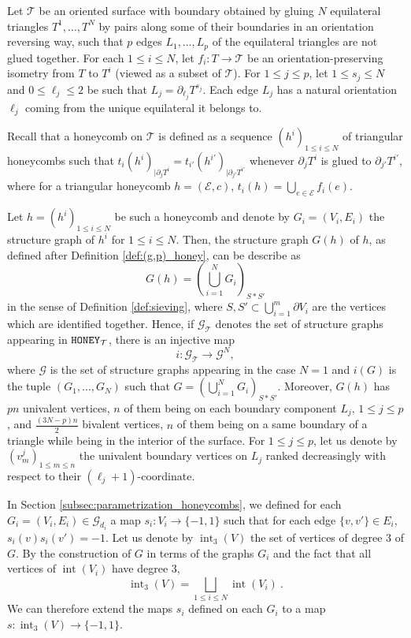 \documentclass[11pt,a4paper]{amsart}
\providecommand{\honey}{\texttt{\textsc{HONEY}}}
\DeclareMathOperator{\interior}{int}
\numberwithin{equation}{section}
\theoremstyle{definition}
\begin{document}
Let $\mathcal{T}$ be an oriented surface with boundary obtained 
by gluing $N$ equilateral triangles $T^1,\ldots,T^N$ by pairs along some of their boundaries in an orientation reversing way, 
such that $p$ edges $L_1,\ldots,L_{p}$ of the equilateral triangles are not glued together. For each $1\leqslant i\leqslant N$, let $f_i:T\rightarrow \mathcal{T}$ be an orientation-preserving isometry from $T$ to $T^i$ (viewed as a subset of $\mathcal{T}$). For $1\leqslant j\leqslant p$, let $1 \leqslant s_j \leqslant N $ and 
$ 0 \leqslant \ell_j \leqslant 2$ 
be such that $L_j=\partial_{\ell_j}T^{s_j}$. Each edge $L_j$ has a natural orientation $\ell_j$ coming from the unique equilateral it belongs to.  

\noindent
Recall that a honeycomb on $\mathcal{T}$ is defined as a sequence $(h^i)_{1\leqslant i\leqslant N}$ of triangular honeycombs such that $t_i(h^i)_{\vert \partial_j T^i}=t_{i'}(h^{i'})_{\vert \partial_{j'}T^{i'}}$ whenever $\partial_jT^i$ is glued to $\partial_{j'}T^{i'}$, where for a triangular honeycomb $h=(\mathcal{E},c)$, $t_i(h)=\bigcup_{e\in\mathcal{E}}f_i(e)$. 

Let $h=(h^i)_{1\leqslant i\leqslant N}$ be such a honeycomb and denote by $G_i=(V_i,E_i)$ the structure graph of $h^i$ for $1\leqslant i\leqslant N$. Then, the structure graph $G(h)$ of $h$, as defined after 
Definition \ref{def:(g,p)_honey}, can be describe as 
$$G(h)=\left(\bigcup_{i=1}^NG_i\right)_{S*S'}$$ 
in the sense of Definition \ref{def:sieving}, 
where $S,S'\subset \bigcup_{i=1}^m\partial V_i$ are the vertices 
which are identified together. 
Hence, if $\mathcal{G}_\mathcal{T}$ denotes the set of structure graphs appearing in 
$\honey_{\mathcal{T}}$, there is an injective map
$$i:\mathcal{G}_{\mathcal{T}}\rightarrow  \mathcal{G}^N,$$
where $\mathcal{G}$ is the set of structure graphs appearing in the case $N=1$ and $i(G)$ is the tuple $(G_1,\ldots,G_N)$ such that $G=\left(\bigcup_{i=1}^NG_i\right)_{S*S'}$.
Moreover, $G(h)$
has $pn$ univalent vertices, 
$n$ of them being on each boundary component 
$L_j,\, 1\leqslant j\leqslant p$, and $\frac{(3N-p)n}{2}$ bivalent vertices, 
$n$ of them being on a same boundary of a triangle while being 
in the interior of the surface. 
For $1 \leqslant j \leqslant p$, let us denote by $(v^j_m)_{1\leqslant m\leqslant n}$ 
the univalent boundary vertices on $L_{j}$ ranked decreasingly with respect to 
their $(\ell_j+1)$-coordinate.




In Section \ref{subsec:parametrization_honeycombs}, 
we defined for each $G_i=(V_i,E_i)\in \mathcal{G}_{d_i}$ 
a map $s_i:V_i\rightarrow \{-1,1\}$ such that for each edge 
$\{v,v'\}\in E_i$, $s_i(v)s_i(v')=-1$. 
Let us denote by $\interior_3(V)$ the set of vertices of degree 
$3$ of $G$. By the construction of $G$ in terms of 
the graphs $G_i$ and the fact that all vertices of 
$\interior(V_i)$ have degree $3$, 
$$\interior_3(V)=\bigsqcup_{1\leqslant i\leqslant N}\interior(V_i) \ .$$
We can therefore extend the maps $s_i$ defined on each 
$G_i$ to a map $s:\interior_3(V) \to \{-1,1\}$.
\end{document}
